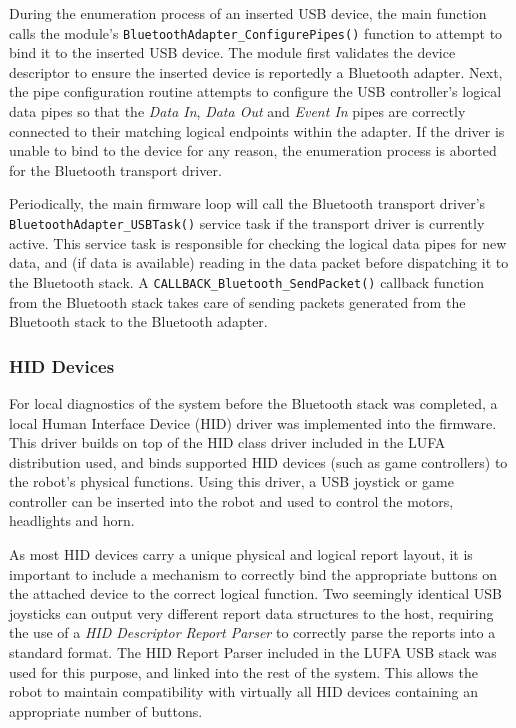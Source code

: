 During the enumeration process of an inserted USB device, the main function calls the module's \lstinline{BluetoothAdapter_ConfigurePipes()} function to attempt to bind it to the inserted USB device. The module first validates the device descriptor to ensure the inserted device is reportedly a Bluetooth adapter. Next, the pipe configuration routine attempts to configure the USB controller's logical data pipes so that the \textit{Data In}, \textit{Data Out} and \textit{Event In} pipes are correctly connected to their matching logical endpoints within the adapter. If the driver is unable to bind to the device for any reason, the enumeration process is aborted for the Bluetooth transport driver.

Periodically, the main firmware loop will call the Bluetooth transport driver's \\ \lstinline{BluetoothAdapter_USBTask()} service task if the transport driver is currently active. This service task is responsible for checking the logical data pipes for new data, and (if data is available) reading in the data packet before dispatching it to the Bluetooth stack. A \lstinline{CALLBACK_Bluetooth_SendPacket()} callback function from the Bluetooth stack takes care of sending packets generated from the Bluetooth stack to the Bluetooth adapter.

\FloatBarrier
\subsubsection{HID Devices}

For local diagnostics of the system before the Bluetooth stack was completed, a local Human Interface Device (HID) driver was implemented into the firmware. This driver builds on top of the HID class driver included in the LUFA distribution used, and binds supported HID devices (such as game controllers) to the robot's physical functions. Using this driver, a USB joystick or game controller can be inserted into the robot and used to control the motors, headlights and horn.

As most HID devices carry a unique physical and logical report layout, it is important to include a mechanism to correctly bind the appropriate buttons on the attached device to the correct logical function. Two seemingly identical USB joysticks can output very different report data structures to the host, requiring the use of a \textit{HID Descriptor Report Parser} to correctly parse the reports into a standard format. The HID Report Parser included in the LUFA USB stack was used for this purpose, and linked into the rest of the system. This allows the robot to maintain compatibility with virtually all HID devices containing an appropriate number of buttons.

